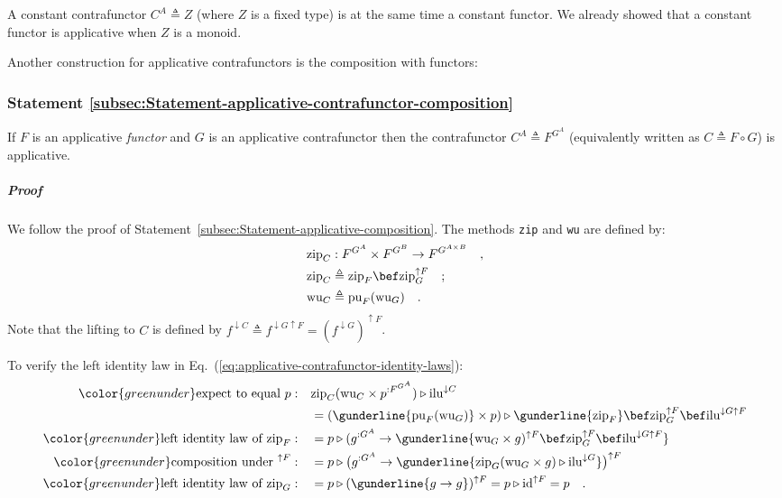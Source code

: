 A constant contrafunctor $C^{A}\triangleq Z$ (where $Z$ is a fixed
type) is at the same time a constant functor. We already showed that
a constant functor is applicative when $Z$ is a monoid. 

Another construction for applicative contrafunctors is the composition
with functors:

\subsubsection{Statement \label{subsec:Statement-applicative-contrafunctor-composition}\ref{subsec:Statement-applicative-contrafunctor-composition}}

If $F$ is an applicative \emph{functor} and $G$ is an applicative
contrafunctor then the contrafunctor $C^{A}\triangleq F^{G^{A}}$
(equivalently written as $C\triangleq F\circ G$) is applicative.

\subparagraph{Proof}

We follow the proof of Statement~\ref{subsec:Statement-applicative-composition}.
The methods \lstinline!zip! and \lstinline!wu! are defined by:
\begin{align*}
 & \text{zip}_{C}:F^{G^{A}}\times F^{G^{B}}\rightarrow F^{G^{A\times B}}\quad,\\
 & \text{zip}_{C}\triangleq\text{zip}_{F}\bef\text{zip}_{G}^{\uparrow F}\quad;\\
 & \text{wu}_{C}\triangleq\text{pu}_{F}(\text{wu}_{G})\quad.
\end{align*}
Note that the lifting to $C$ is defined by $f^{\downarrow C}\triangleq f^{\downarrow G\uparrow F}=(f^{\downarrow G})^{\uparrow F}$. 

To verify the left identity law in Eq.~(\ref{eq:applicative-contrafunctor-identity-laws}):
\begin{align*}
{\color{greenunder}\text{expect to equal }p:}\quad & \text{zip}_{C}(\text{wu}_{C}\times p^{:F^{G^{A}}})\triangleright\text{ilu}^{\downarrow C}\\
 & =(\gunderline{\text{pu}_{F}(\text{wu}_{G})}\times p)\triangleright\gunderline{\text{zip}_{F}}\bef\text{zip}_{G}^{\uparrow F}\bef\text{ilu}^{\downarrow G\uparrow F}\\
{\color{greenunder}\text{left identity law of }\text{zip}_{F}:}\quad & =p\triangleright(g^{:G^{A}}\rightarrow\gunderline{\text{wu}_{G}\times g)^{\uparrow F}\bef\text{zip}_{G}^{\uparrow F}\bef\text{ilu}^{\downarrow G\uparrow F}}\\
{\color{greenunder}\text{composition under }^{\uparrow F}:}\quad & =p\triangleright\big(g^{:G^{A}}\rightarrow\gunderline{\text{zip}_{G}(\text{wu}_{G}\times g)\triangleright\text{ilu}^{\downarrow G}}\big)^{\uparrow F}\\
{\color{greenunder}\text{left identity law of }\text{zip}_{G}:}\quad & =p\triangleright(\gunderline{g\rightarrow g})^{\uparrow F}=p\triangleright\text{id}^{\uparrow F}=p\quad.
\end{align*}

